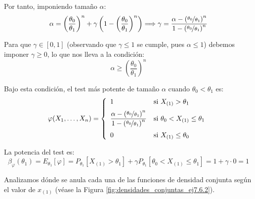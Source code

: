 \begin{ejercicio}
\begin{description}
\begin{description}
            Por tanto, imponiendo tamaño $\alpha$:
            \begin{equation*}
                \alpha = \left(\frac{\theta_0}{\theta_1}\right)^n + \gamma \left(1 - \left(\frac{\theta_0}{\theta_1}\right)^n\right) \Longrightarrow \gamma = \frac{\alpha - \left(\nicefrac{\theta_0}{\theta_1}\right)^n}{1 - \left(\nicefrac{\theta_0}{\theta_1}\right)^n}
            \end{equation*}

            Para que $\gamma \in [0,1]$ (observando que $\gamma \leq 1$ se cumple, pues $\alpha \leq 1$) debemos imponer $\gamma \geq 0$, lo que nos lleva a la condición:
            \begin{equation*}
                \alpha \geq \left(\frac{\theta_0}{\theta_1}\right)^n
            \end{equation*}

            Bajo esta condición, el test más potente de tamaño $\alpha$ cuando $\theta_0 < \theta_1$ es:
            \begin{equation*}
                \varphi(X_1, \ldots, X_n) = \left\{\begin{array}{ll}
                    1 & \text{si\ } X_{(1)} > \theta_1 \\[6pt]
                    \dfrac{\alpha - \left(\nicefrac{\theta_0}{\theta_1}\right)^n}{1 - \left(\nicefrac{\theta_0}{\theta_1}\right)^n} & \text{si\ } \theta_0 < X_{(1)} \leq \theta_1 \\[12pt]
                    0 & \text{si\ } X_{(1)} \leq \theta_0
                \end{array}\right.
            \end{equation*}

            La potencia del test es:
            \begin{equation*}
                \beta_\varphi(\theta_1) = E_{\theta_1}[\varphi] = P_{\theta_1}[X_{(1)} > \theta_1] + \gamma P_{\theta_1}[\theta_0 < X_{(1)} \leq \theta_1] = 1 + \gamma \cdot 0 = 1
            \end{equation*}
        \end{description}

        \item[Caso $\theta_0 > \theta_1$.] Analizamos dónde se anula cada una de las funciones de densidad conjunta según el valor de $x_{(1)}$ (véase la Figura \ref{fig:densidades_conjuntas_ej7.6.2}).
        \begin{figure}[h]
            \centering
\end{figure}
\end{description}
\end{ejercicio}
